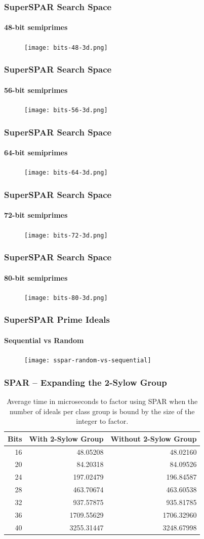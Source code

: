 \documentclass{beamer}
\begin{document}
\begin{frame}
\frametitle{SuperSPAR Search Space}
\framesubtitle{48-bit semiprimes}
\begin{figure}
\texttt{[image: bits-48-3d.png]}
\end{figure}
\end{frame}
\begin{frame}
\frametitle{SuperSPAR Search Space}
\framesubtitle{56-bit semiprimes}
\begin{figure}
\texttt{[image: bits-56-3d.png]}
\end{figure}
\end{frame}
\begin{frame}
\frametitle{SuperSPAR Search Space}
\framesubtitle{64-bit semiprimes}
\begin{figure}
\texttt{[image: bits-64-3d.png]}
\end{figure}
\end{frame}
\begin{frame}
\frametitle{SuperSPAR Search Space}
\framesubtitle{72-bit semiprimes}
\begin{figure}
\texttt{[image: bits-72-3d.png]}
\end{figure}
\end{frame}
\begin{frame}
\frametitle{SuperSPAR Search Space}
\framesubtitle{80-bit semiprimes}
\begin{figure}
\texttt{[image: bits-80-3d.png]}
\end{figure}
\end{frame}

\begin{frame}
\frametitle{SuperSPAR Prime Ideals}
\framesubtitle{Sequential vs Random}
\begin{figure}
\texttt{[image: sspar-random-vs-sequential]}
\end{figure}
\end{frame}


\begin{frame}
\frametitle{SPAR -- Expanding the 2-Sylow Group}
\begin{table}
\centering
\begin{tabular}{| r | r | r |}
	\hline
	Bits & With 2-Sylow Group & Without 2-Sylow Group \\
	\hline
	16 &   48.05208 &   48.02160 \\
	20 &   84.20318 &   84.09526 \\
	24 &  197.02479 &  196.84587 \\
	28 &  463.70674 &  463.60538 \\
	32 &  937.57875 &  935.81785 \\
	36 & 1709.55629 & 1706.32960 \\
	40 & 3255.31447 & 3248.67998 \\
	\hline
\end{tabular}
\caption{Average time in microseconds to factor using SPAR when the number of ideals per class group is bound by the size of the integer to factor.}
\end{table}
\end{frame}
\end{document}
